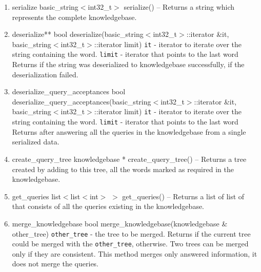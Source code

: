 \begin{enumerate}
\begin{detail}
{Generates the ``.dot'' file of the knowledgebase for graphical representation.} 
\end{detail}
\item \begin{detail}
{serialize}
{basic\_string$<$int32\_t$>$ serialize()}
{--}
{Returns a string which represents the complete knowledgebase.} 
\end{detail}
\item \begin{detail}
{deserialize**}
{bool deserialize(basic\_string$<$int32\_t$>$::iterator \&it, \\ basic\_string$<$int32\_t$>$::iterator limit)}
{\texttt{it} - iterator to iterate over the string containing the word.
 \texttt{limit} - iterator that points to the last word }
{Returns \true if the string was deserialized to knowledgebase successfully, \false if the deserialization failed.} 
\end{detail}
\item \begin{detail}
{deserialize\_query\_acceptances}
{bool deserialize\_query\_acceptances(basic\_string$<$int32\_t$>$::iterator \&it,\\ basic\_string$<$int32\_t$>$::iterator limit)}
{\texttt{it} - iterator to iterate over the string containing the word.
 \texttt{limit} - iterator that points to the last word }
{Returns \true after answering all the queries in the knowledgebase from a single serialized data. } 
\end{detail}
\item \begin{detail}
{create\_query\_tree}
{knowledgebase * create\_query\_tree()}
{--}
{Returns a tree created by adding to this tree, all the words marked as required in the knowledgebase.} 
\end{detail}
\item \begin{detail}
{get\_queries}
{list$<$list$<$int$>$ $>$ get\_queries()}
{--}
{Returns a list of list of \integer that consists of all the queries existing in the knowledgebase.} 
\end{detail}
\item \begin{detail}
{merge\_knowledgebase}
{bool merge\_knowledgebase(knowledgebase \& other\_tree)}
{\texttt{other\_tree} - the tree to be merged.}
{Returns \true if the current tree could be merged with the \texttt{other\_tree}, \false otherwise. Two trees can be merged only if they are consistent. This method merges only answered information, it does not merge the queries. } 

\end{detail}
\end{enumerate}
